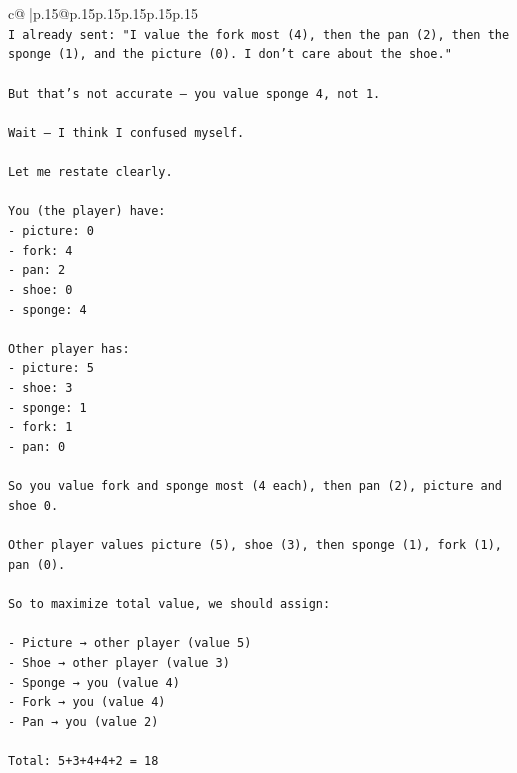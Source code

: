 \documentclass{article}
\begin{document}
{\begin{supertabular}{c@{$\;$}|p{.15\linewidth}@{}p{.15\linewidth}p{.15\linewidth}p{.15\linewidth}p{.15\linewidth}p{.15\linewidth}}
{{{\\ 
\texttt{I already sent: "I value the fork most (4), then the pan (2), then the sponge (1), and the picture (0). I don't care about the shoe."} \\
\\ 
\texttt{But that’s not accurate — you value sponge 4, not 1.} \\
\\ 
\texttt{Wait — I think I confused myself.} \\
\\ 
\texttt{Let me restate clearly.} \\
\\ 
\texttt{You (the player) have:  } \\
\texttt{{-} picture: 0  } \\
\texttt{{-} fork: 4  } \\
\texttt{{-} pan: 2  } \\
\texttt{{-} shoe: 0  } \\
\texttt{{-} sponge: 4} \\
\\ 
\texttt{Other player has:  } \\
\texttt{{-} picture: 5  } \\
\texttt{{-} shoe: 3  } \\
\texttt{{-} sponge: 1  } \\
\texttt{{-} fork: 1  } \\
\texttt{{-} pan: 0} \\
\\ 
\texttt{So you value fork and sponge most (4 each), then pan (2), picture and shoe 0.} \\
\\ 
\texttt{Other player values picture (5), shoe (3), then sponge (1), fork (1), pan (0).} \\
\\ 
\texttt{So to maximize total value, we should assign:} \\
\\ 
\texttt{{-} Picture → other player (value 5)  } \\
\texttt{{-} Shoe → other player (value 3)  } \\
\texttt{{-} Sponge → you (value 4)  } \\
\texttt{{-} Fork → you (value 4)  } \\
\texttt{{-} Pan → you (value 2)} \\
\\ 
\texttt{Total: 5+3+4+4+2 = 18} \\
\\ 
}}}
\end{supertabular}}
\end{document}

